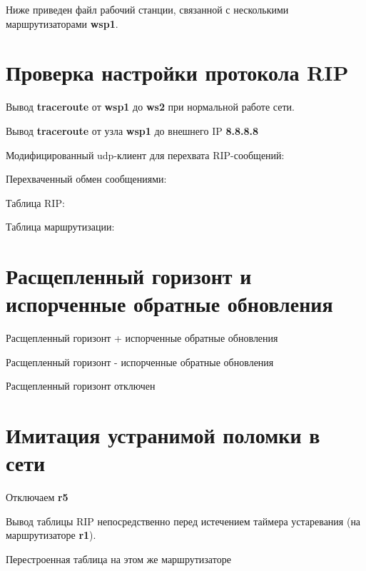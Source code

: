 \documentclass[a4paper,12pt]{article}
\begin{document}
Ниже приведен файл  рабочий станции, связанной с несколькими маршрутизаторами \textbf{wsp1}.



\section{Проверка настройки протокола RIP}
Вывод \textbf{traceroute} от \textbf{wsp1} до \textbf{ws2} при нормальной работе сети.


Вывод \textbf{traceroute} от узла \textbf{wsp1} до внешнего IP \textbf{8.8.8.8}


Модифицированный udp-клиент для перехвата RIP-сообщений:


Перехваченный обмен сообщениями:


Таблица RIP:


Таблица маршрутизации:



\section{Расщепленный горизонт и испорченные обратные обновления}
Расщепленный горизонт + испорченные обратные обновления


Расщепленный горизонт - испорченные обратные обновления


Расщепленный горизонт отключен



\section{Имитация устранимой поломки в сети}
Отключаем \textbf{r5}


Вывод таблицы RIP непосредственно перед истечением таймера устаревания (на маршрутизаторе \textbf{r1}).


Перестроенная таблица на этом же маршрутизаторе
\end{document}
